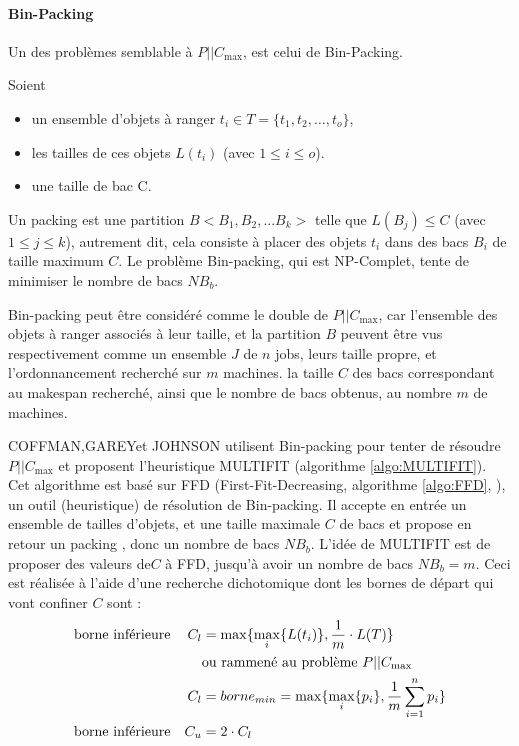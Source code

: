 \documentclass[a4paper,12pt]{report}
\theoremstyle{plain}				%
\theoremstyle{definition}				%
\newcommand\problemGrahamP{$P||C_{\max}$\xspace}
\begin{document}
\bigskip
\paragraph{Bin-Packing}
Un des problèmes semblable à \problemGrahamP, est celui de Bin-Packing. 

Soient
\begin{itemize}
  \item un ensemble d'objets à ranger $t_i \in T=\{t_1, t_2, \ldots, t_o\}$, 
  \item les tailles de ces objets $L(t_i)$ (avec $1\leq i \leq o$). 
  \item une taille de bac C.
\end{itemize} 
Un packing est une partition $B < B_1, B_2, ... B_k > $ 
  telle que $L(B_j) \leq C$ (avec $1\leq j \leq k$), 
  autrement dit, cela consiste à placer des objets $t_i$ dans des bacs $B_i$ de taille maximum $C$. 
Le problème Bin-packing, qui est NP-Complet, tente de 
  minimiser le nombre de bacs $NB_b$. 

Bin-packing peut être considéré comme le double de \problemGrahamP, 
  car l'ensemble des objets à ranger associés à leur taille, et la partition $B$ 
  peuvent être vus respectivement comme 
  un ensemble $J$ de $n$ jobs, leurs taille propre, 
  et l'ordonnancement recherché sur $m$ machines.
la taille $C$ des bacs correspondant au makespan recherché, 
  ainsi que le nombre de bacs obtenus, au  nombre $m$ de machines.
  
\bigskip
COFFMAN,GAREYet JOHNSON \cite{coffman1978application} utilisent Bin-packing 
  pour tenter de résoudre \problemGrahamP et proposent 
  l'heuristique MULTIFIT (algorithme \ref{algo:MULTIFIT}). 
Cet algorithme est basé sur FFD 
  (First-Fit-Decreasing, algorithme \ref{algo:FFD}, \cite{rieck2021basic}), 
  un outil (heuristique) de résolution de Bin-packing. 
Il accepte en entrée un ensemble de tailles d'objets, et une taille maximale $C$ de bacs 
  et propose en retour un packing , donc un nombre de bacs $NB_b$.
L'idée de MULTIFIT est de proposer des valeurs de$C$ à FFD, jusqu'à avoir un nombre de bacs $NB_b=m$.
Ceci est réalisée à l'aide d'une recherche dichotomique dont les bornes de départ qui vont confiner $C$ sont : 
\begin{align*}
&\textnormal{borne inférieure} 	&C_l 	&= \max \{ \max_i \{ L(t_i) \}, \frac{1}{m} \cdot L(T) \} \\
& 								& 		& \textnormal{ou rammené au problème \problemGrahamP} \\	 
& 								& C_l 	&= borne_{min} = \max \{ \max_i\{p_i\}, \frac{1}{m} \sum_{i=1}^{n} p_i \} \\
&\textnormal{borne inférieure} 	&C_u 	&= 2 \cdot C_l 
\end{align*}
\end{document}
